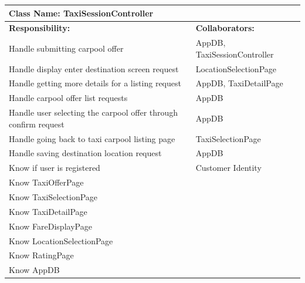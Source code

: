 \documentclass[]{article}
\begin{document}
\begin{table}[H]
\centering
\begin{tabular}{|p{6cm}|p{6cm}|}
\hline 
 \multicolumn{2}{|l|}{\textbf{Class Name: TaxiSessionController}} \\
\hline
\textbf{Responsibility:} & \textbf{Collaborators:} \\
\hline
Handle submitting carpool offer & AppDB, TaxiSessionController\\ \hline
Handle display enter destination screen request & LocationSelectionPage\\ \hline
Handle getting more details for a listing request & AppDB, TaxiDetailPage\\ \hline
Handle carpool offer list requests & AppDB\\ \hline
Handle user selecting the carpool offer through confirm request & AppDB\\ \hline 
Handle going back to taxi carpool listing page & TaxiSelectionPage\\ \hline
Handle saving destination location request & AppDB\\ \hline
Know if user is registered & Customer Identity\\ \hline
Know TaxiOfferPage & \\ \hline 
Know TaxiSelectionPage & \\ \hline
Know TaxiDetailPage & \\ \hline
Know FareDisplayPage & \\ \hline
Know LocationSelectionPage & \\ \hline
Know RatingPage & \\ \hline
Know AppDB & \\ \hline
\end{tabular}
\end{table}
\end{document}
